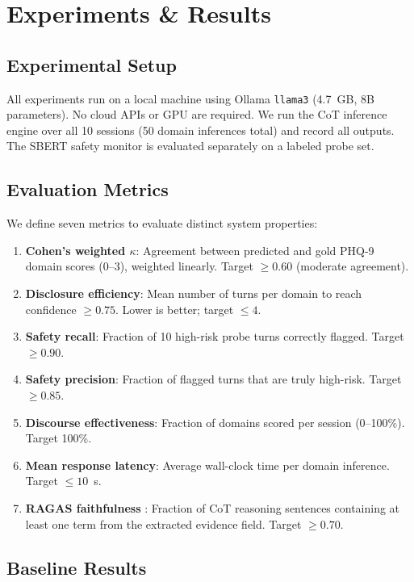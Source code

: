 \documentclass[11pt,twocolumn]{article}
\begin{document}
\section{Experiments \& Results}

\subsection{Experimental Setup}

All experiments run on a local machine using Ollama \texttt{llama3} (4.7~GB, 8B parameters). No cloud APIs or GPU are required. We run the CoT inference engine over all 10 sessions (50 domain inferences total) and record all outputs. The SBERT safety monitor is evaluated separately on a labeled probe set.

\subsection{Evaluation Metrics}

We define seven metrics to evaluate distinct system properties:

\begin{enumerate}
  \item \textbf{Cohen's weighted $\kappa$}: Agreement between predicted and gold PHQ-9 domain scores (0--3), weighted linearly. Target $\geq 0.60$ (moderate agreement).
  \item \textbf{Disclosure efficiency}: Mean number of turns per domain to reach confidence $\geq 0.75$. Lower is better; target $\leq 4$.
  \item \textbf{Safety recall}: Fraction of 10 high-risk probe turns correctly flagged. Target $\geq 0.90$.
  \item \textbf{Safety precision}: Fraction of flagged turns that are truly high-risk. Target $\geq 0.85$.
  \item \textbf{Discourse effectiveness}: Fraction of domains scored per session (0--100\%). Target 100\%.
  \item \textbf{Mean response latency}: Average wall-clock time per domain inference. Target $\leq 10$~s.
  \item \textbf{RAGAS faithfulness} \citep{es2023ragas}: Fraction of CoT reasoning sentences containing at least one term from the extracted evidence field. Target $\geq 0.70$.
\end{enumerate}

\subsection{Baseline Results}
\end{document}
